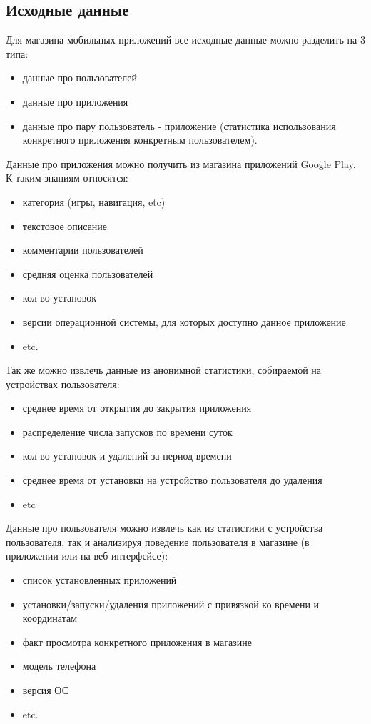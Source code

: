 \documentclass[12pt,a4paper]{report}
\begin{document}
\subsection{Исходные данные}
Для магазина мобильных приложений все исходные данные можно разделить на 3 типа:
\begin{itemize}
\item данные про пользователей
\item данные про приложения
\item данные про пару пользователь - приложение (статистика использования конкретного приложения конкретным пользователем).
\end{itemize}
Данные про приложения можно получить из магазина приложений Google Play. К таким знаниям относятся:
\begin{itemize}
\item категория (игры, навигация, etc)
\item текстовое описание
\item комментарии пользователей
\item средняя оценка пользователей
\item кол-во установок
\item версии операционной системы, для которых доступно данное приложение
\item etc.
\end{itemize}
Так же можно извлечь данные из анонимной статистики, собираемой на устройствах пользователя:
\begin{itemize}
\item среднее время от открытия до закрытия приложения
\item распределение числа запусков по времени суток
\item кол-во установок и удалений за период времени
\item среднее время от установки на устройство пользователя до удаления
\item etc
\end{itemize}
Данные про пользователя можно извлечь как из статистики с устройства пользователя, так и анализируя поведение пользователя в магазине (в приложении или на веб-интерфейсе):
\begin{itemize}
\item список установленных приложений
\item установки/запуски/удаления приложений с привязкой ко времени и координатам
\item факт просмотра конкретного приложения в магазине
\item модель телефона
\item версия ОС
\item etc.
\end{itemize}
\end{document}
